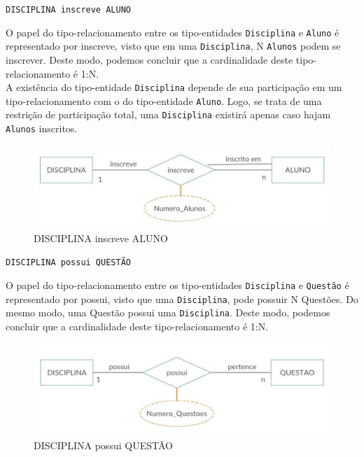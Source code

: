 \documentclass[12pt,a4paper]{article}
\begin{document}
\begin{center}
    \texttt{DISCIPLINA \texttt{inscreve} ALUNO}
\end{center}

O papel do tipo-relacionamento entre os tipo-entidades \texttt{Disciplina} e {\texttt{Aluno}} é representado por inscreve, visto que em uma \texttt{Disciplina}, N \texttt{Alunos} podem se inscrever.  Deste modo, podemos concluir que a cardinalidade deste tipo-relacionamento é 1:N.\\

A existência do tipo-entidade \texttt{Disciplina} depende de sua participação em um tipo-relacionamento com o do tipo-entidade  {\texttt{Aluno}}. Logo, se trata de uma restrição de participação total, uma \texttt{Disciplina} existirá apenas caso hajam \texttt{Alunos} inscritos.\\

\begin{center}
\begin{figure}[h]
    \centering
    \includegraphics[width=\linewidth]{disciplinaAluno.jpg}
    \caption{DISCIPLINA inscreve ALUNO}
    \label{fig:disciplinaAluno}
\end{figure}
\end{center}

\pagebreak
\vspace{0.5cm}
\begin{center}
    \texttt{DISCIPLINA \texttt{possui} QUESTÃO}
\end{center}

O papel do tipo-relacionamento entre os tipo-entidades \texttt{Disciplina} e \texttt{Questão} é representado por possui, visto que uma \texttt{Disciplina}, pode possuir N Questões. Do mesmo modo, uma Questão possui uma \texttt{Disciplina}. Deste modo, podemos concluir que a cardinalidade deste tipo-relacionamento é 1:N.\\

\begin{center}
\begin{figure}[h]
    \centering
    \includegraphics[width=\linewidth]{disciplinaQuestao.jpg}
    \caption{DISCIPLINA possui QUESTÃO}
    \label{fig:disciplinaQuestao}
\end{figure}
\end{center}
\end{document}
